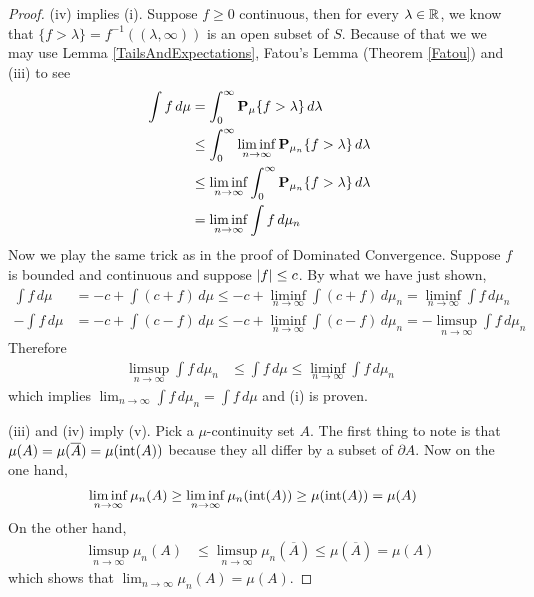 \begin{proof}
(iv) implies (i).  Suppose $f \geq 0$ continuous, then for every
$\lambda \in \reals$, we know that $\lbrace f > \lambda \rbrace =
f^{-1}((\lambda, \infty))$ is an open subset of $S$.  Because of that
we we may use Lemma
\ref{TailsAndExpectations}, Fatou's Lemma (Theorem \ref{Fatou}) and (iii) to see
\begin{align*}
\int f \, d\mu &= \int_0^\infty \sprobability{f > \lambda}{\mu} \,
d\lambda \\
&\leq \int_0^\infty \liminf_{n \to \infty} \sprobability{f > \lambda}{\mu_n} \, d\lambda \\
&\leq \liminf_{n \to \infty} \int_0^\infty \sprobability{f >
  \lambda}{\mu_n} \, d\lambda \\
&= \liminf_{n \to \infty} \int f \, d\mu_n\\
\end{align*}
Now we play the same trick as in the proof of Dominated Convergence.
Suppose $f$ is bounded and continuous and suppose $\abs{f} \leq c$.
By what we have just shown,
\begin{align*}
\int f \, d\mu &= -c + \int (c+f) \, d\mu \leq -c + \liminf_{n \to
  \infty} \int (c+ f) \, d\mu_n = \liminf_{n \to \infty} \int f \, d\mu_n \\
-\int f\, d\mu &= -c + \int (c-f) \, d\mu \leq -c + \liminf_{n \to
  \infty} \int (c- f) \, d\mu_n =  -\limsup_{n \to \infty} \int f \, d\mu_n
\end{align*}
Therefore 
\begin{align*}
\limsup_{n \to \infty} \int f \, d\mu_n &\leq \int f \, d\mu
\leq \liminf_{n \to \infty} \int f \, d\mu_n
\end{align*} which implies $\lim_{n
  \to \infty} \int f \, d\mu_n = \int f \, d\mu$ and (i) is proven.

 (iii) and (iv) imply (v).  Pick a $\mu$-continuity set $A$.  The first thing to
note is that $\mu(A) = \mu(\overline{A}) = \mu(\interior(A))$ because
they all differ by a subset of $\partial A$.   Now on
the one hand, 
\begin{align*}
\liminf_{n \to \infty} \mu_n(A) &\geq \liminf_{n \to \infty} \mu_n(\interior(A)) \geq \mu(\interior(A)) = \mu(A)
\end{align*}
On the other hand, 
\begin{align*}
\limsup_{n \to \infty} \mu_n(A) &\leq \limsup_{n \to \infty}
\mu_n(\overline{A}) \leq \mu(\overline{A}) = \mu(A)
\end{align*}
which shows that $\lim_{n \to \infty} \mu_n(A) = \mu(A)$.


\end{proof}
